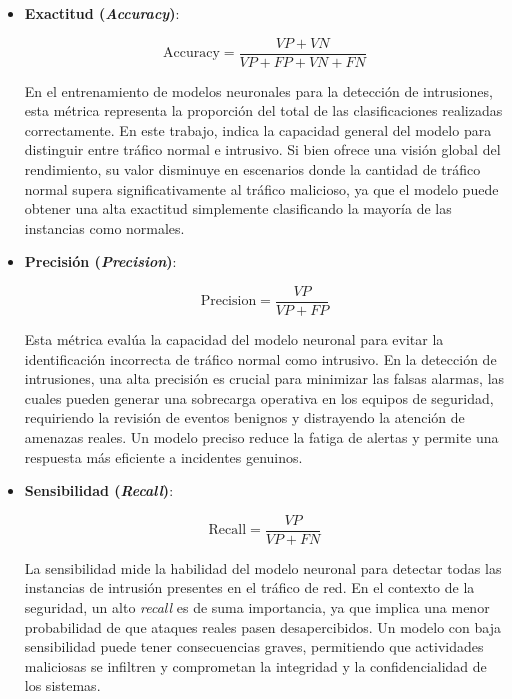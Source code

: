 \begin{itemize}
    \item \textbf{Exactitud (\textit{Accuracy})}: \label{met:Accuracy}
    
\begin{equation}
    \text{Accuracy} = \frac{VP + VN}{VP + FP + VN + FN}
\end{equation}

En el entrenamiento de modelos neuronales para la detección de intrusiones, esta métrica representa la proporción del total de las clasificaciones realizadas correctamente. En este trabajo, indica la capacidad general del modelo para distinguir entre tráfico normal e intrusivo. Si bien ofrece una visión global del rendimiento, su valor disminuye en escenarios donde la cantidad de tráfico normal supera significativamente al tráfico malicioso, ya que el modelo puede obtener una alta exactitud simplemente clasificando la mayoría de las instancias como normales.

\item \textbf{Precisión (\textit{Precision})}: \label{met:Precision}

\begin{equation}
    \text{Precision} = \frac{VP}{VP + FP}
\end{equation}

Esta métrica evalúa la capacidad del modelo neuronal para evitar la identificación incorrecta de tráfico normal como intrusivo. En la detección de intrusiones, una alta precisión es crucial para minimizar las falsas alarmas, las cuales pueden generar una sobrecarga operativa en los equipos de seguridad, requiriendo la revisión de eventos benignos y distrayendo la atención de amenazas reales. Un modelo preciso reduce la fatiga de alertas y permite una respuesta más eficiente a incidentes genuinos.

\item \textbf{Sensibilidad (\textit{Recall})}: \label{met:Recall}

\begin{equation}
    \text{Recall} = \frac{VP}{VP + FN}
\end{equation}

La sensibilidad mide la habilidad del modelo neuronal para detectar todas las instancias de intrusión presentes en el tráfico de red. En el contexto de la seguridad, un alto \textit{recall} es de suma importancia, ya que implica una menor probabilidad de que ataques reales pasen desapercibidos. Un modelo con baja sensibilidad puede tener consecuencias graves, permitiendo que actividades maliciosas se infiltren y comprometan la integridad y la confidencialidad de los sistemas.


\end{itemize}
